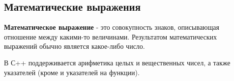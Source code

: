 \subsection{Математические
выражения}\label{ux43cux430ux442ux435ux43cux430ux442ux438ux447ux435ux441ux43aux438ux435-ux432ux44bux440ux430ux436ux435ux43dux438ux44f}

\textbf{Математическое выражение} - это совокупность знаков, описывающая
отношение между какими-то величинами. Результатом математических
выражений обычно является какое-либо число.

В С++ поддерживается арифметика целых и вещественных чисел, а также указателей
(кроме  и указателей на функции).